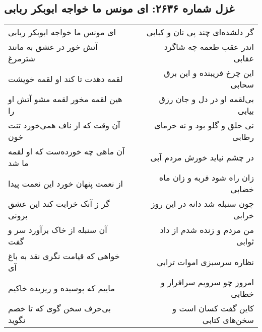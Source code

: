\begin{center}
\section*{غزل شماره ۲۶۳۶: ای مونس ما خواجه ابوبکر ربابی}
\label{sec:2636}
\begin{longtable}{l p{0.5cm} r}
ای مونس ما خواجه ابوبکر ربابی
&&
گر دلشده‌ای چند پی نان و کبابی
\\
آتش خور در عشق به مانند شترمرغ
&&
اندر عقب طعمه چه شاگرد عقابی
\\
لقمه دهدت تا کند او لقمه خویشت
&&
این چرخ فریبنده و این برق سحابی
\\
هین لقمه مخور لقمه مشو آتش او را
&&
بی‌لقمه او در دل و جان رزق بیابی
\\
آن وقت که از ناف همی‌خورد تنت خون
&&
نی حلق و گلو بود و نه خرمای رطابی
\\
آن ماهی چه خورده‌ست که او لقمه ما شد
&&
در چشم نیاید خورش مردم آبی
\\
از نعمت پنهان خورد این نعمت پیدا
&&
زان راه شود فربه و زان ماه خضابی
\\
گر ز آنک خرابت کند این عشق برونی
&&
چون سنبله شد دانه در این روز خرابی
\\
آن سنبله از خاک برآورد سر و گفت
&&
من مردم و زنده شدم از داد ثوابی
\\
خواهی که قیامت نگری نقد به باغ آی
&&
نظاره سرسبزی اموات ترابی
\\
ماییم که پوسیده و ریزیده خاکیم
&&
امروز چو سرویم سرافراز و خطابی
\\
بی‌حرف سخن گوی که تا خصم نگوید
&&
کاین گفت کسان است و سخن‌های کتابی
\\
\end{longtable}
\end{center}
